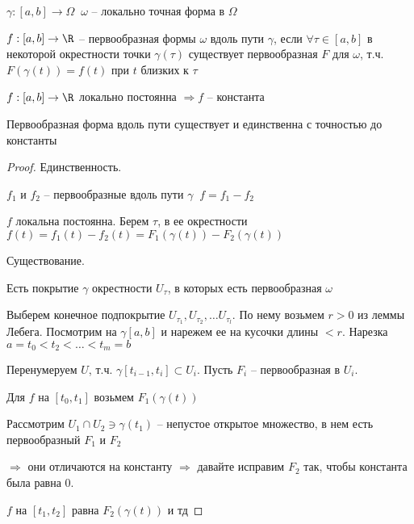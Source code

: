 
\begin{definition}\thmslashn
	
	$\gamma:[a, b] \to \Omega\;\; \omega$ -- локально точная форма в $\Omega$
	
	$f:[a, b] \to \R$ -- первообразная формы $\omega$ вдоль пути $\gamma$, если $\forall \tau \in [a, b]$ в некоторой окрестности точки $\gamma(\tau)$ существует первообразная $F$ для $\omega$, т.ч. $F(\gamma(t)) = f(t)$ при $t$ близких к $\tau$
	
\end{definition}

\begin{lemma}
	$f:[a, b] \to \R$ локально постоянна $\Rightarrow f$ -- константа
\end{lemma}

\begin{theorem}\thmslashn
	
	Первообразная форма вдоль пути существует и единственна с точностью до константы
	
\end{theorem}

\begin{proof}
	
	Единственность.
	
	 $f_1$ и $f_2$ -- первообразные вдоль пути $\gamma\;\; f = f_1 - f_2$ 
	
	$f$ локальна постоянна. Берем $\tau$, в ее окрестности  $f(t) = f_1(t) - f_2(t) = F_1(\gamma(t)) - F_2(\gamma(t))$
	
	Существование. 
	
	Есть покрытие $\gamma$ окрестности $U_\tau$, в которых есть первообразная $\omega$
	
	Выберем конечное подпокрытие $U_{\tau_1}, U_{\tau_2}, \ldots U_{\tau_l}$. По нему возьмем $r>0$ из леммы Лебега. Посмотрим на $\gamma[a, b]$ и нарежем ее на кусочки длины $<r$. Нарезка $a = t_0 < t_2 < \ldots < t_m = b$
	
	Перенумеруем $U$, т.ч. $\gamma[t_{i-1}, t_i] \subset U_i$. Пусть $F_i$ -- первообразная в $U_i$. 
	
	Для $f$ на $[t_0, t_1]$ возьмем $F_1(\gamma(t))$
	
	Рассмотрим $U_1 \cap U_2 \ni \gamma(t_1)$ -- непустое открытое множество, в нем есть первообразный $F_1$ и $F_2$
	
	$\Rightarrow$ они отличаются на константу $\Rightarrow$ давайте исправим $F_2$ так, чтобы константа была равна 0.
	
	$f$ на $[t_1, t_2]$ равна $F_2(\gamma(t))$ и тд
	
\end{proof}

